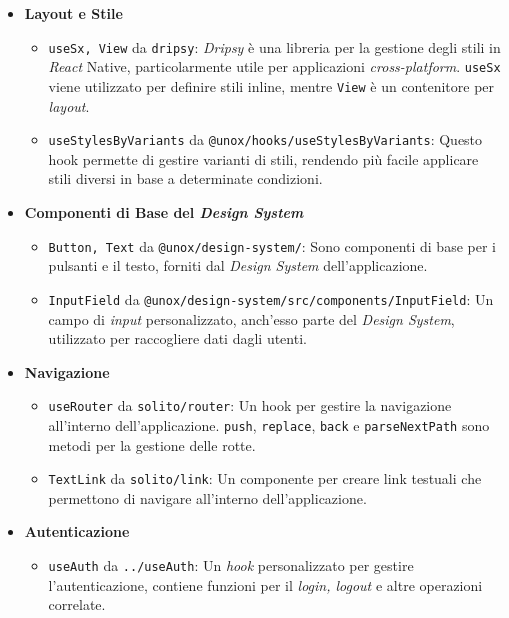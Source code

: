 \begin{itemize}
    \item \textbf{Layout e Stile}
    \begin{itemize}
        \item \texttt{useSx, View} da \texttt{dripsy}: \textit{Dripsy} è una libreria per la gestione degli stili in \textit{React} Native, particolarmente utile per applicazioni \textit{cross-platform}. \texttt{useSx} viene utilizzato per definire stili inline, mentre \texttt{View} è un contenitore per \textit{layout}.
        \item \texttt{useStylesByVariants} da \texttt{@unox/hooks/useStylesByVariants}: Questo hook permette di gestire varianti di stili, rendendo più facile applicare stili diversi in base a determinate condizioni.
    \end{itemize}
    
    \item \textbf{Componenti di Base del \textit{Design System}}
    \begin{itemize}
        \item \texttt{Button, Text} da \texttt{@unox/design-system/}: Sono componenti di base per i pulsanti e il testo, forniti dal \textit{Design System} dell'applicazione.
        \item \texttt{InputField} da \texttt{@unox/design-system/src/components/InputField}: Un campo di \textit{input} personalizzato, anch'esso parte del \textit{Design System}, utilizzato per raccogliere dati dagli utenti.
    \end{itemize}
    
    \item \textbf{Navigazione}
    \begin{itemize}
        \item \texttt{useRouter} da \texttt{solito/router}: Un hook per gestire la navigazione all'interno dell'applicazione. \texttt{push}, \texttt{replace}, \texttt{back} e \texttt{parseNextPath} sono metodi per la gestione delle rotte.
        \item \texttt{TextLink} da \texttt{solito/link}: Un componente per creare link testuali che permettono di navigare all'interno dell'applicazione.
    \end{itemize}
    
    \item \textbf{Autenticazione}
    \begin{itemize}
        \item \texttt{useAuth} da \texttt{../useAuth}: Un \textit{hook} personalizzato per gestire l'autenticazione, contiene funzioni per il \textit{login, logout} e altre operazioni correlate.
    \end{itemize}
    

\end{itemize}
